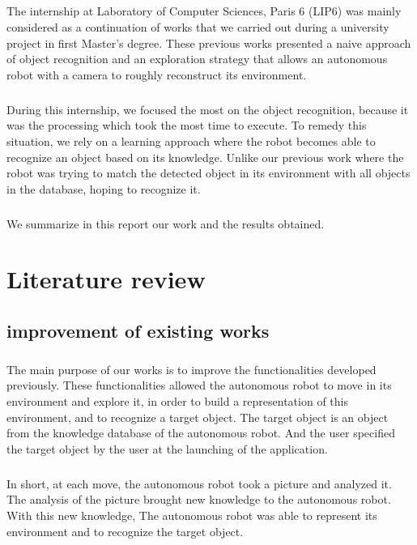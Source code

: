 \documentclass[12pt]{report}
\begin{document}
\paragraph{}
The internship at Laboratory of Computer Sciences, Paris 6 (LIP6) was mainly considered as a continuation of works that we carried out during a university project in first Master's degree. These previous works presented a naive approach of object recognition and an exploration strategy that allows an autonomous robot with a camera to roughly reconstruct its environment.

\paragraph{}
During this internship, we focused the most on the object recognition, because it was the processing which took the most time to execute. To remedy this situation, we rely on a learning approach where the robot becomes able to recognize an object based on its knowledge. Unlike our previous work where the robot was trying to match the detected object in its environment with all objects in the database, hoping to recognize it.

\paragraph{}
We summarize in this report our work and the results obtained.

\chapter{Literature review}
\section{improvement of existing works}

\paragraph{}
The main purpose of our works is to improve the functionalities developed previously. These functionalities allowed the autonomous robot to move in its environment and explore it, in order to build a representation of this environment, and to recognize a target object. The target object is an object from the knowledge database of the autonomous robot. And the user specified the target object by the user at the launching of the application.

\paragraph{}
In short, at each move, the autonomous robot took a picture and analyzed it. The analysis of the picture brought new knowledge to the autonomous robot. With this new knowledge, The autonomous robot was able to represent its environment and to recognize the target object. 
\end{document}
